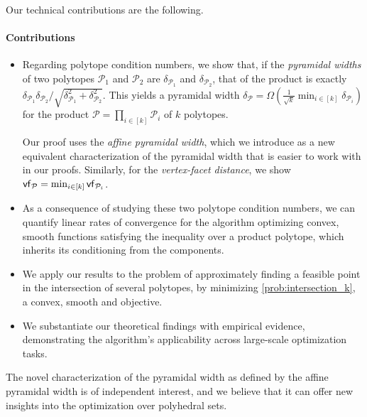 \documentclass[twoside]{article}
\newcommand{\bigomega}[1]{\Omega( #1 )}
\newcommand{\mP}{\mathcal{P}}
\begin{document}
Our technical contributions are the following.

\paragraph{Contributions} 
\begin{itemize}
    \item Regarding polytope condition numbers, we show that, if the \textit{pyramidal widths} of two polytopes $\mathcal{P}_1$ and $\mathcal{P}_2$ are $\delta_{\mathcal{P}_1}$ and $\delta_{\mathcal{P}_2}$, that of the product is exactly $\delta_{\mathcal{P}_1} \delta_{\mathcal{P}_2} /\sqrt{\delta_{\mathcal{P}_1}^2 + \delta_{\mathcal{P}_2}^2}$. This yields a pyramidal width $\delta_\mathcal{P} = \bigomega{\frac{1}{\sqrt{k}}\min_{i\in[k]} \delta_{\mathcal{P}_i}}$ for the product $\mathcal{P} = \prod_{i\in[k]} \mathcal{P}_i$ of $k$ polytopes.
    
    Our proof uses the \textit{affine pyramidal width}, which we introduce as a new equivalent characterization of the pyramidal width that is easier to work with in our proofs. Similarly, for the \textit{vertex-facet distance}, we show $\vf{\mP} = \min_{i\in[k]} \vf{\mP_{i}}$. 

   \item As a consequence of studying these two polytope condition numbers, we can quantify linear rates of convergence for the \AFW{} algorithm optimizing convex, smooth functions satisfying the \PL{} inequality over a product polytope, which inherits its conditioning from the components. 
   \item We apply our results to the problem of approximately finding a feasible point in the intersection of several polytopes, by minimizing \eqref{prob:intersection_k}, a convex, smooth and \PL{} objective.
   \item We substantiate our theoretical findings with empirical evidence, demonstrating the algorithm's applicability across large-scale optimization tasks.
\end{itemize}

The novel characterization of the pyramidal width as defined by the affine pyramidal width is of independent interest, and we believe that it can offer new insights into the optimization over polyhedral sets.
\end{document}
